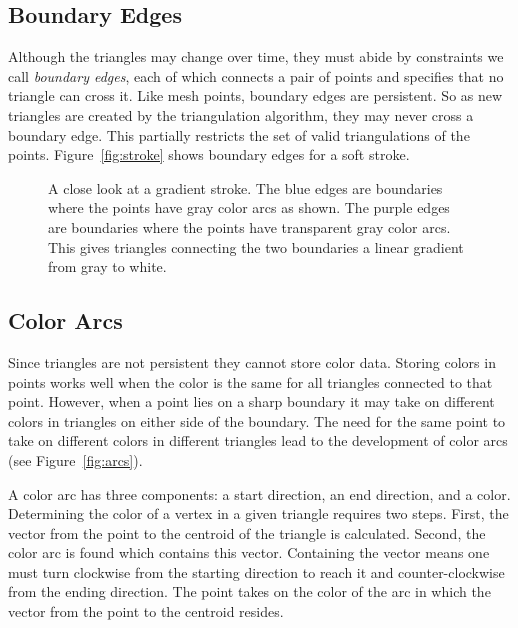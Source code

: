 \documentclass[review]{acmsiggraph}
\begin{document}
\subsection{Boundary Edges}
Although the triangles may change over time, they must abide by constraints we call
\emph{boundary edges}, each of which connects a pair of points and specifies that no triangle
can cross it. Like mesh points, boundary edges are persistent. 
%
So as new triangles are created by the triangulation algorithm, they
may never cross a boundary edge.  
This partially restricts the set of valid triangulations of the points.  Figure~\ref{fig:stroke} shows boundary edges for a soft  stroke.

\begin{figure}[t]
    \centering
    \caption{A close look at a gradient stroke. The blue edges are boundaries where
    the points have gray color arcs as shown. The purple edges are boundaries where
    the points have transparent gray color arcs. This gives triangles connecting the two boundaries
    a linear gradient from gray to white.}
    \label{fig:softarcs}
\end{figure}

\subsection{Color Arcs}
Since triangles are not persistent they cannot store color data.
Storing colors in points works well when the color is the same for all triangles connected
to that point. However, when a point lies on a sharp boundary it may take on different colors in
triangles on either side of the boundary. The need for the same point to take on different
colors in different triangles lead to the development of color arcs (see Figure~\ref{fig:arcs}).

A color arc has three components: a start direction, an end direction, and a color. 
Determining the color of a vertex in a given triangle requires two steps. First,
the vector from the point to the centroid of the triangle is calculated. Second,
the color arc is found which contains this vector. Containing the vector means one must turn
clockwise from the starting direction to reach it and counter-clockwise from the ending direction.
The point takes on the color of the arc in which the vector from the point to the centroid resides.
\end{document}
